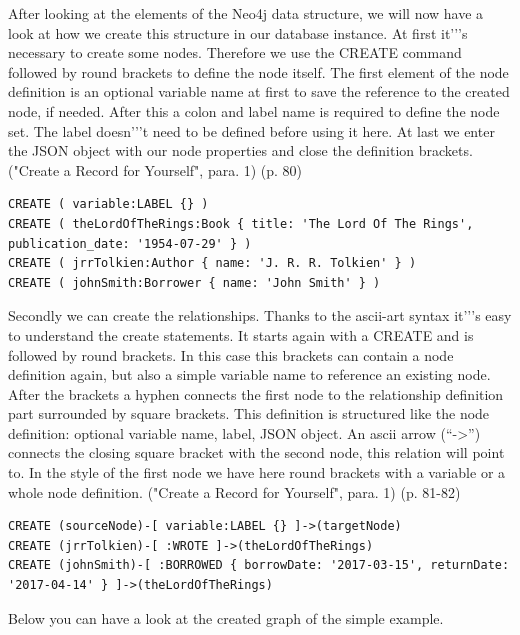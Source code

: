 After looking at the elements of the Neo4j data structure, we will now have a look at how we create this structure in our database instance.
At first it'’'s necessary to create some nodes. Therefore we use the CREATE command followed by round brackets to define the node itself. The first element of the node definition is an optional variable name at first to save the reference to the created node, if needed. After this a colon and label name is required to define the node set. The label doesn'’'t need to be defined before using it here. At last we enter the JSON object with our node properties and close the definition brackets.
\cite{NeoTechnologyInc.2017d} ("Create a Record for Yourself", para. 1) \cite{Gupta.2015} (p. 80)

\begin{lstlisting}[frame=single, caption=Create Database, label=creategraphdb]
CREATE ( variable:LABEL {} )
CREATE ( theLordOfTheRings:Book { title: 'The Lord Of The Rings', publication_date: '1954-07-29' } )
CREATE ( jrrTolkien:Author { name: 'J. R. R. Tolkien' } )
CREATE ( johnSmith:Borrower { name: 'John Smith' } )
\end{lstlisting}

Secondly we can create the relationships. Thanks to the ascii-art syntax it'’'s easy to understand the create statements. It starts again with a CREATE and is followed by round brackets. In this case this brackets can contain a node definition again, but also a simple variable name to reference an existing node. After the brackets a hyphen connects the first node to the relationship definition part surrounded by square brackets. This definition is structured like the node definition: optional variable name, label, JSON object. An ascii arrow (“->”) connects the closing square bracket with the second node, this relation will point to. In the style of the first node we have here round brackets with a variable or a  whole node definition.
\cite{NeoTechnologyInc.2017d} ("Create a Record for Yourself", para. 1) \cite{Gupta.2015} (p. 81-82)

\begin{lstlisting}[frame=single, caption=Create Relationships, label=creategraphrelationships]
CREATE (sourceNode)-[ variable:LABEL {} ]->(targetNode)
CREATE (jrrTolkien)-[ :WROTE ]->(theLordOfTheRings)
CREATE (johnSmith)-[ :BORROWED { borrowDate: '2017-03-15', returnDate: '2017-04-14' } ]->(theLordOfTheRings)
\end{lstlisting}

Below you can have a look at the created graph of the simple example.

